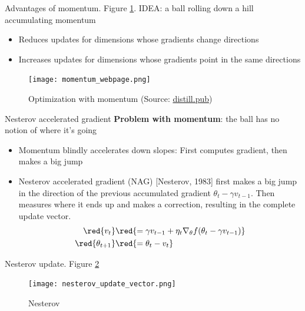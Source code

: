 \documentclass[english]{article}
\begin{document}

\item {Advantages of momentum}. Figure \ref{Momentum}.
IDEA: a ball rolling down a hill accumulating momentum
\begin{itemize}
\item Reduces updates for dimensions whose gradients change directions
\item Increases updates for dimensions whose gradients point in the same directions
\end{itemize}

\begin{figure}
 \centering
\texttt{[image: momentum\_webpage.png]}
\caption{Optimization with momentum (Source: \href{https://distill.pub/2017/momentum/}{distill.pub})}
\label{Momentum}
\end{figure}








\item {Nesterov accelerated gradient}
\textbf{Problem with momentum}: the ball has no notion of where it's going


\begin{itemize}
\item Momentum blindly accelerates down slopes: First computes gradient, then makes a big jump

\item Nesterov accelerated gradient (NAG) [Nesterov, 1983] first makes a big jump in the direction of the previous accumulated gradient $\theta_t - \gamma v_{t-1}$. Then measures where it ends up and makes a correction, resulting in the complete update vector.
\begin{align*}
\red{v_{t} }&\red{= \gamma v_{t-1} + \eta_t \nabla_\theta f(\theta_t - \gamma v_{t-1})} \\ 
\red{\theta_{t+1}} &\red{= \theta_t - v_t}
\end{align*}

\end{itemize}








\item {Nesterov update}. Figure \ref{Nesterov}
\begin{figure}
 \centering
\texttt{[image: nesterov\_update\_vector.png]}
\caption{Nesterov}
\label{Nesterov}
\end{figure}
\end{document}

